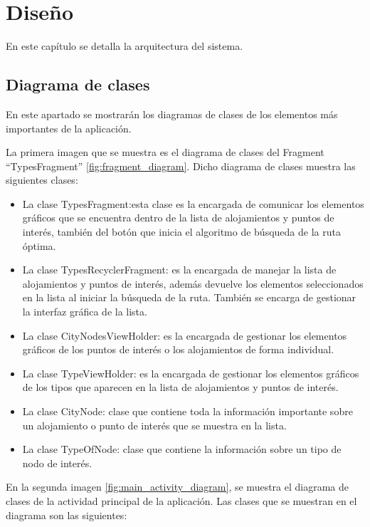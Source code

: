\chapter{Diseño}
En este capítulo se detalla la arquitectura del sistema.
\section[Diagrama de clases]{Diagrama de clases}
En este apartado se mostrarán los diagramas de clases de los elementos más importantes de la aplicación.\newline

La primera imagen que se muestra es el diagrama de clases del Fragment \enquote{TypesFragment} \ref{fig:fragment_diagram}. Dicho diagrama de clases muestra las siguientes clases:
\begin{itemize}
	\item La clase TypesFragment:esta clase es la encargada de comunicar los elementos gráficos que se encuentra dentro de la lista de alojamientos y puntos de interés, también del botón que inicia el algoritmo de búsqueda de la ruta óptima.
	\item La clase TypesRecyclerFragment: es la encargada de manejar la lista de alojamientos y puntos de interés, además devuelve los elementos seleccionados en la lista al iniciar la búsqueda de la ruta. También se encarga de gestionar la interfaz gráfica de la lista.
	\item La clase CityNodesViewHolder: es la encargada de gestionar los elementos gráficos de los puntos de interés o los alojamientos de forma individual.
	\item La clase TypeViewHolder: es la encargada de gestionar los elementos gráficos de los tipos que aparecen en la lista de alojamientos y puntos de interés.
	\item La clase CityNode: clase que contiene toda la información importante sobre un alojamiento o punto de interés que se muestra en la lista.
	\item La clase TypeOfNode: clase que contiene la información sobre un tipo de nodo de interés.
\end{itemize}
\vspace{0.06in}
En la segunda imagen \ref{fig:main_activity_diagram}, se muestra el diagrama de clases de la actividad principal de la aplicación. Las clases que se muestran en el diagrama son las siguientes:
